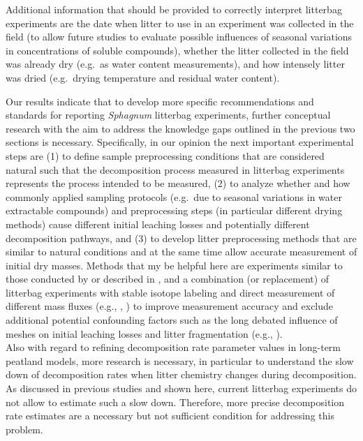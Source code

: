 \documentclass[bg, manuscript]{copernicus}
\begin{document}
Additional information that should be provided to correctly interpret litterbag experiments are the date when litter to use in an experiment was collected in the field (to allow future studies to evaluate possible influences of seasonal variations in concentrations of soluble compounds), whether the litter collected in the field was already dry (e.g.~as water content measurements), and how intensely litter was dried (e.g.~drying temperature and residual water content).

Our results indicate that to develop more specific recommendations and standards for reporting \emph{Sphagnum} litterbag experiments, further conceptual research with the aim to address the knowledge gaps outlined in the previous two sections is necessary. Specifically, in our opinion the next important experimental steps are (1) to define sample preprocessing conditions that are considered natural such that the decomposition process measured in litterbag experiments represents the process intended to be measured, (2) to analyze whether and how commonly applied sampling protocols (e.g.~due to seasonal variations in water extractable compounds) and preprocessing steps (in particular different drying methods) cause different initial leaching losses and potentially different decomposition pathways, and (3) to develop litter preprocessing methods that are similar to natural conditions and at the same time allow accurate measurement of initial dry masses. Methods that my be helpful here are experiments similar to those conducted by \citet{Lind.2022} or described in \citet{Barlocher.1997}, and a combination (or replacement) of litterbag experiments with stable isotope labeling and direct measurement of different mass fluxes (e.g., \citet{Kammer.2011}, \citet{Cotrufo.2015}) to improve measurement accuracy and exclude additional potential confounding factors such as the long debated influence of meshes on initial leaching losses and litter fragmentation (e.g., \citet{Bokhorst.2013}).\\
Also with regard to refining decomposition rate parameter values in long-term peatland models, more research is necessary, in particular to understand the slow down of decomposition rates when litter chemistry changes during decomposition. As discussed in previous studies \citep[\citet{Frolking.2001}]{Clymo.1998} and shown here, current litterbag experiments do not allow to estimate such a slow down. Therefore, more precise decomposition rate estimates are a necessary but not sufficient condition for addressing this problem.
\end{document}
